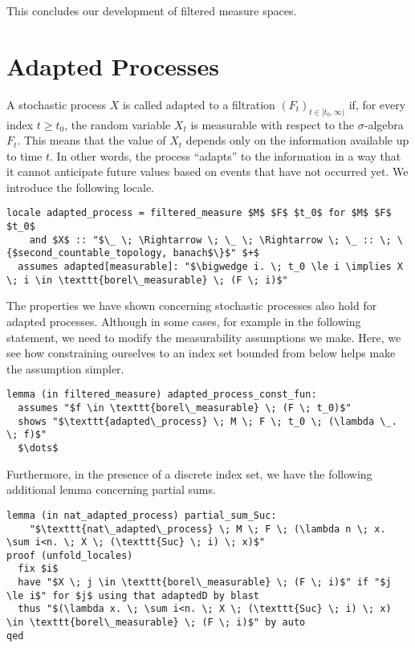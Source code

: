 This concludes our development of filtered measure spaces.

\section{Adapted Processes}

A stochastic process $X$ is called adapted to a filtration $(F_t)_{t \in [t_0, \infty)}$ if, for every index $t \ge t_0$, the random variable $X_t$ is measurable with respect to the $\sigma$-algebra $F_t$. This means that the value of $X_t$ depends only on the information available up to time $t$. In other words, the process ``adapts'' to the information in a way that it cannot anticipate future values based on events that have not occurred yet. We introduce the following locale.

\begin{isalemma}
{\small
\begin{lstlisting}[style=isabelle]
locale adapted_process = filtered_measure $M$ $F$ $t_0$ for $M$ $F$ $t_0$ 
	and $X$ :: "$\_ \; \Rightarrow \; \_ \; \Rightarrow \; \_ :: \; \{$second_countable_topology, banach$\}$" $+$
  assumes adapted[measurable]: "$\bigwedge i. \; t_0 \le i \implies X \; i \in \texttt{borel\_measurable} \; (F \; i)$"
\end{lstlisting}
}
\end{isalemma}

The properties we have shown concerning stochastic processes also hold for adapted processes. Although in some cases, for example in the following statement, we need to modify the measurability assumptions we make. Here, we see how constraining ourselves to an index set bounded from below helps make the assumption simpler.

\begin{isalemma}
{\small
\begin{lstlisting}[style=isabelle]
lemma (in filtered_measure) adapted_process_const_fun:
  assumes "$f \in \texttt{borel\_measurable} \; (F \; t_0)$"
  shows "$\texttt{adapted\_process} \; M \; F \; t_0 \; (\lambda \_. \; f)$"
  $\dots$
\end{lstlisting}
}
\end{isalemma}

Furthermore, in the presence of a discrete index set, we have the following additional lemma concerning partial sums.

\begin{isalemma}
{\small
\begin{lstlisting}[style=isabelle]
lemma (in nat_adapted_process) partial_sum_Suc: 
	"$\texttt{nat\_adapted\_process} \; M \; F \; (\lambda n \; x. \sum i<n. \; X \; (\texttt{Suc} \; i) \; x)$" 
proof (unfold_locales)
  fix $i$
  have "$X \; j \in \texttt{borel\_measurable} \; (F \; i)$" if "$j \le i$" for $j$ using that adaptedD by blast
  thus "$(\lambda x. \; \sum i<n. \; X \; (\texttt{Suc} \; i) \; x) \in \texttt{borel\_measurable} \; (F \; i)$" by auto
qed
\end{lstlisting}
}
\end{isalemma}

